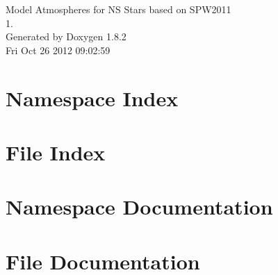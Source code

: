 \documentclass{book}
\begin{document}
\hypersetup{pageanchor=false,citecolor=blue}
\begin{titlepage}
\vspace*{7cm}
\begin{center}
{\Large Model Atmospheres for N\-S Stars based on S\-P\-W2011 \\[1ex]\large 1. }\\
\vspace*{1cm}
{\large Generated by Doxygen 1.8.2}\\
\vspace*{0.5cm}
{\small Fri Oct 26 2012 09:02:59}\\
\end{center}
\end{titlepage}
\clearemptydoublepage
{}
\tableofcontents
\clearemptydoublepage
{}
\hypersetup{pageanchor=true,citecolor=blue}
\chapter{Namespace Index}

\chapter{File Index}

\chapter{Namespace Documentation}








\chapter{File Documentation}








\printindex
\end{document}
